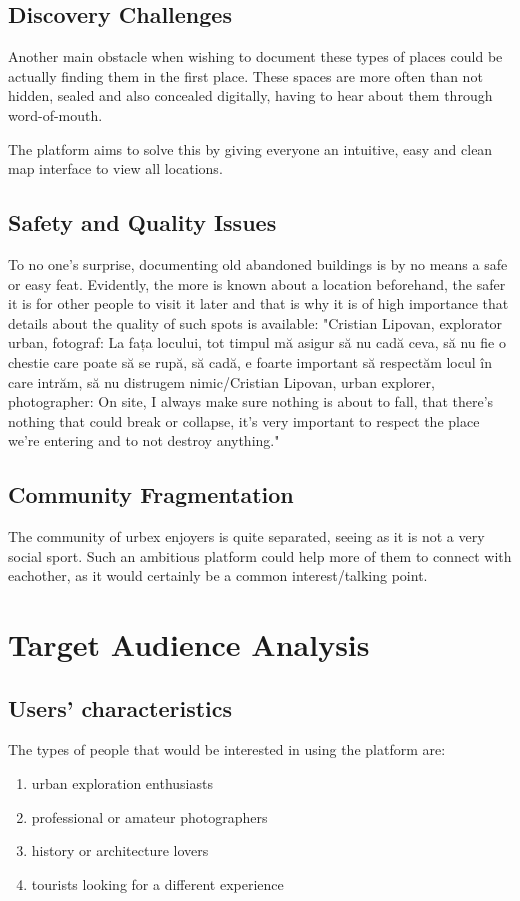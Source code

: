 \documentclass[12pt,a4paper]{report}
\begin{document}
\subsection{Discovery Challenges}
Another main obstacle when wishing to document these types of places could be actually finding them in the first place. These spaces are more often than not hidden, sealed and also concealed digitally, having to hear about them through word-of-mouth.

The platform aims to solve this by giving everyone an intuitive, easy and clean map interface to view all locations.

\subsection{Safety and Quality Issues}
To no one's surprise, documenting old abandoned buildings is by no means a safe or easy feat. Evidently, the more is known about a location beforehand, the safer it is for other people to visit it later and that is why it is of high importance that details about the quality of such spots is available: "Cristian Lipovan, explorator urban, fotograf: La fața locului, tot timpul mă asigur să nu cadă ceva, să nu fie o chestie care poate să se rupă, să cadă, e foarte important să respectăm locul în care intrăm, să nu distrugem nimic/Cristian Lipovan, urban explorer, photographer: On site, I always make sure nothing is about to fall, that there's nothing that could break or collapse, it's very important to respect the place we're entering and to not destroy anything."~\cite{articleUrbexInformation}

\subsection{Community Fragmentation}
The community of urbex enjoyers is quite separated, seeing as it is not a very social sport. Such an ambitious platform could help more of them to connect with eachother, as it would certainly be a common interest/talking point.

\section{Target Audience Analysis}
\subsection{Users' characteristics}
The types of people that would be interested in using the platform are:
\begin{enumerate}
    \item urban exploration enthusiasts
    \item professional or amateur photographers
    \item history or architecture lovers
    \item tourists looking for a different experience
\end{enumerate}
\end{document}
